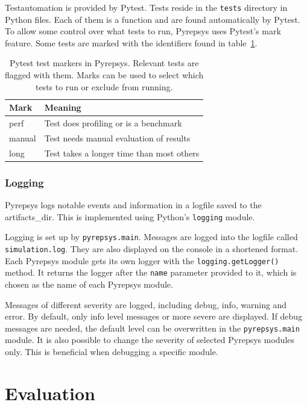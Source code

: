 \documentclass[%
    ]{\PathToTumTemplate/thesis/tum_thesis}
\begin{document}
Testautomation is provided by Pytest.
Tests reside in the \texttt{tests} directory in Python files.
Each of them is a function and are found automatically by Pytest.
To allow some control over what tests to run, Pyrepsys uses Pytest's mark feature.
Some tests are marked with the identifiers found in table~\ref{tab:pytest_marks}.

\begin{table}[tbp]
\centering
\begin{tabular}{ll}
\toprule
\textbf{Mark}        & \textbf{Meaning} \\ \midrule
perf       & Test does profiling or is a benchmark \\
manual     & Test needs manual evaluation of results \\
long       & Test takes a longer time than most others \\
\bottomrule
\end{tabular}
\caption{
	Pytest test markers in Pyrepsys.
	Relevant tests are flagged with them.
	Marks can be used to select which tests to run or exclude from running.
}
\label{tab:pytest_marks}
\end{table}


\subsection{Logging}
Pyrepsys logs notable events and information in a logfile saved to the \gls{artifacts_dir}.
This is implemented using Python's \lstinline{logging} module.

Logging is set up by \texttt{pyrepsys.main}.
Messages are logged into the logfile called \texttt{simulation.log}.
They are also displayed on the console in a shortened format.
Each Pyrepsys module gets its own logger with the \lstinline{logging.getLogger()} method.
It returns the logger after the \texttt{name} parameter provided to it, which is chosen as the name of each Pyrepsys module.

Messages of different severity are logged, including debug, info, warning and error.
By default, only info level messages or more severe are displayed.
If debug messages are needed, the default level can be overwritten in the \texttt{pyrepsys.main} module.
It is also possible to change the severity of selected Pyrepsys modules only.
This is beneficial when debugging a specific module.




\chapter{Evaluation} \label{chap:evaluation}
\end{document}
